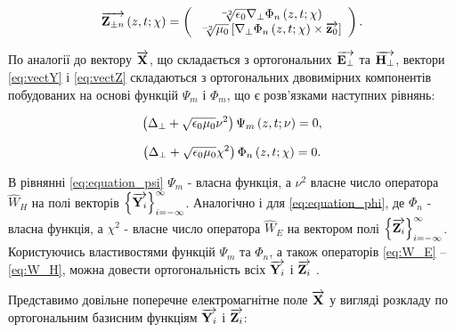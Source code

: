 \begin{equation} \label{eq:vectZ}
\overrightarrow{\mathbf Z_{\pm n}} \left( z,t;\chi \right) =
\left( \begin{array}{c} 
\sqrt[-2]{\epsilon_0} \nabla_\perp \Phi_n \left( z,t;\chi \right) \\ 
\sqrt[-2]{\mu_0} \left[ \nabla_\perp \Phi_n \left( z,t;\chi \right) \times \overrightarrow{\mathbf z_0} \right] \\ 
\end{array} \right).
\end{equation}

По аналогії до вектору $ \overrightarrow{\mathbf X} $, що складається з ортогональних 
$ \overrightarrow{\mathbf E_\perp} $ та $ \overrightarrow{\mathbf H_\perp} $, вектори \eqref{eq:vectY} і 
\eqref{eq:vectZ} складаються з ортогональних двовимірних компонентів 
побудованих на основі функцій $ \Psi_m $ і $ \Phi_m $, що є розв'язками
наступних рівнянь:

\begin{equation} \label{eq:equation_psi}
\left( \Delta_\perp + \sqrt{\epsilon_0 \mu_0} \nu^2 \right) 
\Psi_m \left( z,t;\nu \right) = 0,
\end{equation}

\begin{equation} \label{eq:equation_phi}
\left( \Delta_\perp + \sqrt{\epsilon_0 \mu_0} \chi^2 \right)
\Phi_n \left( z,t;\chi \right) = 0.
\end{equation}

В рівнянні \eqref{eq:equation_psi} $ \Psi_m $ - власна функція, а $ \nu^2 $ 
власне число оператора $ \widehat{W}_H $ на полі векторів 
$ \left\{ \overrightarrow{\mathbf Y_i} \right\}_{i=-\infty}^\infty $. Аналогічно і для 
\eqref{eq:equation_phi}, де $ \Phi_n $ - власна функція, а $ \chi^2 $ - 
власне число оператора $ \widehat{W}_E $ на вектором полі
$ \left\{ \overrightarrow{\mathbf Z_i} \right\}_{i=-\infty}^\infty $. Користуючись 
властивостями функцій $ \Psi_m $ та $ \Phi_n $, а також операторів 
\eqref{eq:W_E} -- \eqref{eq:W_H}, можна довести ортогональність всіх 
$ \overrightarrow{\mathbf Y_i} $ і $ \overrightarrow{\mathbf Z_i} $ \cite{imp:Tretyakov1994}.

Представимо довільне поперечне електромагнітне поле $ \overrightarrow{\mathbf X} $ у вигляді 
розкладу по ортогональним базисним функціям $ \overrightarrow{\mathbf Y_i} $ і $ \overrightarrow{\mathbf Z_i} $:


